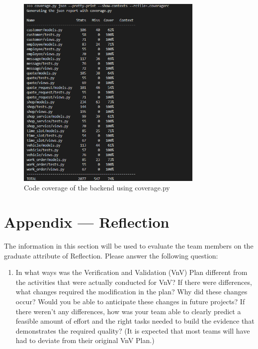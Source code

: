\documentclass[12pt, titlepage]{article}
\begin{document}
\begin{figure}[H]
    \centering
    \includegraphics[width=0.80\textwidth]{VnVReport/result_images/coverage.png}
    \caption{Code coverage of the backend using coverage.py}
    \label{fig:unit-testing}
\end{figure}




\newpage{}
\section*{Appendix --- Reflection}

The information in this section will be used to evaluate the team members on the
graduate attribute of Reflection.  Please answer the following question:

\begin{enumerate}
  \item In what ways was the Verification and Validation (VnV) Plan different
  from the activities that were actually conducted for VnV?  If there were
  differences, what changes required the modification in the plan?  Why did
  these changes occur?  Would you be able to anticipate these changes in future
  projects?  If there weren't any differences, how was your team able to clearly
  predict a feasible amount of effort and the right tasks needed to build the
  evidence that demonstrates the required quality?  (It is expected that most
  teams will have had to deviate from their original VnV Plan.)
\end{enumerate}
\end{document}
